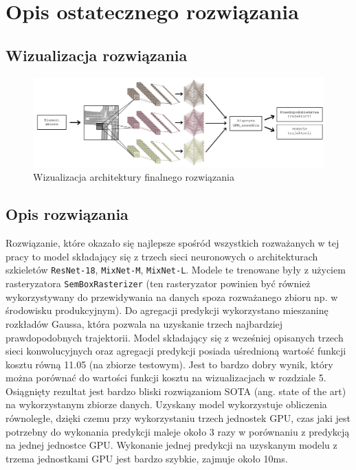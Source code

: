 \chapter{Opis ostatecznego rozwiązania}
\thispagestyle{chapterBeginStyle}

\section{Wizualizacja rozwiązania}

\begin{figure}[htbp]
    \centering
    \includegraphics[width=\linewidth]{nn_schema_ensemble.png}
    \caption{Wizualizacja architektury finalnego rozwiązania}
\end{figure}

\section{Opis rozwiązania}
Rozwiązanie, które okazało się najlepsze spośród wszystkich rozważanych w tej pracy to model składający się z trzech sieci neuronowych o architekturach szkieletów \texttt{ResNet-18}, \texttt{MixNet-M}, \texttt{MixNet-L}. Modele te trenowane były z użyciem rasteryzatora \texttt{SemBoxRasterizer} (ten rasteryzator powinien być również wykorzystywany do przewidywania na danych spoza rozważanego zbioru np. w środowisku produkcyjnym). Do agregacji predykcji wykorzystano mieszaninę rozkładów Gaussa, która pozwala na uzyskanie trzech najbardziej prawdopodobnych trajektorii. Model składający się z wcześniej opisanych trzech sieci konwolucyjnych oraz agregacji predykcji posiada uśrednioną wartość funkcji kosztu równą 11.05 (na zbiorze testowym). Jest to bardzo dobry wynik, który można porównać do wartości funkcji kosztu na wizualizacjach w rozdziale 5. Osiągnięty rezultat jest bardzo bliski rozwiązaniom SOTA (ang. state of the art) na wykorzystanym zbiorze danych. Uzyskany model wykorzystuje obliczenia równoległe, dzięki czemu przy wykorzystaniu trzech jednostek GPU, czas jaki jest potrzebny do wykonania predykcji maleje około 3 razy w porównaniu z predykcją na jednej jednostce GPU. Wykonanie jednej predykcji na uzyskanym modelu z trzema jednostkami GPU jest bardzo szybkie, zajmuje około 10ms.